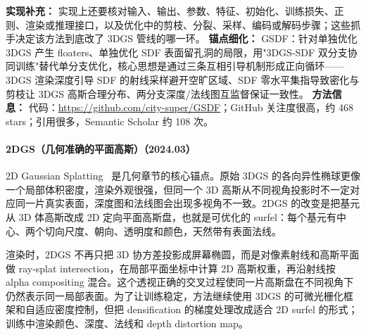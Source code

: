 \textbf{实现补充：} 实现上还要核对输入、输出、参数、特征、初始化、训练损失、正则、渲染或推理接口，以及优化中的剪枝、分裂、采样、编码或解码步骤；这些抓手决定该方法到底改了 3DGS 管线的哪一环。
\textbf{锚点细化：} GSDF：针对单独优化 3DGS 产生 floaters、单独优化 SDF 表面留孔洞的局限，用"3DGS-SDF 双分支协同训练"替代单分支优化，核心思想是通过三条互相引导机制形成正向循环——3DGS 渲染深度引导 SDF 的射线采样避开空旷区域、SDF 零水平集指导致密化与剪枝让 3DGS 高斯合理分布、两分支深度/法线图互监督保证一致性。
\textbf{方法信息：} 代码：\url{https://github.com/city-super/GSDF}；GitHub 关注度很高，约 468 stars；引用很多，Semantic Scholar 约 108 次。



\paragraph{2DGS（几何准确的平面高斯）（2024.03）}
2D Gaussian Splatting~\cite{2403_17888} 是几何章节的核心锚点。原始 3DGS 的各向异性椭球更像一个局部体积密度，渲染外观很强，但同一个 3D 高斯从不同视角投影时不一定对应同一片真实表面，深度图和法线图会出现多视角不一致。2DGS 的改变是把基元从 3D 体高斯改成 2D 定向平面高斯盘，也就是可优化的 surfel：每个基元有中心、两个切向尺度、朝向、透明度和颜色，天然带有表面法线。

渲染时，2DGS 不再只把 3D 协方差投影成屏幕椭圆，而是对像素射线和高斯平面做 ray-splat intersection，在局部平面坐标中计算 2D 高斯权重，再沿射线按 alpha compositing 混合。这个透视正确的交叉过程使同一片高斯盘在不同视角下仍然表示同一局部表面。为了让训练稳定，方法继续使用 3DGS 的可微光栅化框架和自适应密度控制，但把 densification 的梯度处理改成适合 2D surfel 的形式；训练中渲染颜色、深度、法线和 depth distortion map。

